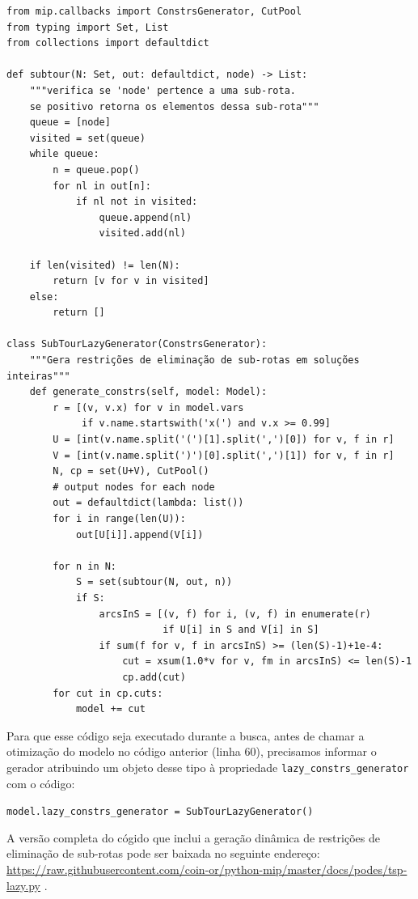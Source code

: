 \documentclass[a4paper,11pt,fleqn]{article}
\begin{document}
{\small
\begin{lstlisting}
from mip.callbacks import ConstrsGenerator, CutPool
from typing import Set, List
from collections import defaultdict

def subtour(N: Set, out: defaultdict, node) -> List:
    """verifica se 'node' pertence a uma sub-rota. 
    se positivo retorna os elementos dessa sub-rota"""
    queue = [node]
    visited = set(queue)
    while queue:
        n = queue.pop()
        for nl in out[n]:
            if nl not in visited:
                queue.append(nl)
                visited.add(nl)

    if len(visited) != len(N):
        return [v for v in visited]
    else:
        return []

class SubTourLazyGenerator(ConstrsGenerator):
    """Gera restrições de eliminação de sub-rotas em soluções inteiras"""
    def generate_constrs(self, model: Model):
        r = [(v, v.x) for v in model.vars
             if v.name.startswith('x(') and v.x >= 0.99]
        U = [int(v.name.split('(')[1].split(',')[0]) for v, f in r]
        V = [int(v.name.split(')')[0].split(',')[1]) for v, f in r]
        N, cp = set(U+V), CutPool()
        # output nodes for each node
        out = defaultdict(lambda: list())
        for i in range(len(U)):
            out[U[i]].append(V[i])

        for n in N:
            S = set(subtour(N, out, n))
            if S:
                arcsInS = [(v, f) for i, (v, f) in enumerate(r)
                           if U[i] in S and V[i] in S]
                if sum(f for v, f in arcsInS) >= (len(S)-1)+1e-4:
                    cut = xsum(1.0*v for v, fm in arcsInS) <= len(S)-1
                    cp.add(cut)
        for cut in cp.cuts:
            model += cut
\end{lstlisting}
}

Para que esse código seja executado durante a busca, antes de chamar a otimização do modelo no código anterior (linha 60), precisamos informar o gerador atribuindo um objeto desse tipo à propriedade \texttt{lazy\_constrs\_generator} com o código: 

\begin{center}
\texttt{model.lazy\_constrs\_generator = SubTourLazyGenerator()}
\end{center}

A versão completa do cógido que inclui a geração dinâmica de restrições de eliminação de sub-rotas pode ser baixada no seguinte endereço: \url{https://raw.githubusercontent.com/coin-or/python-mip/master/docs/podes/tsp-lazy.py} .
\end{document}
